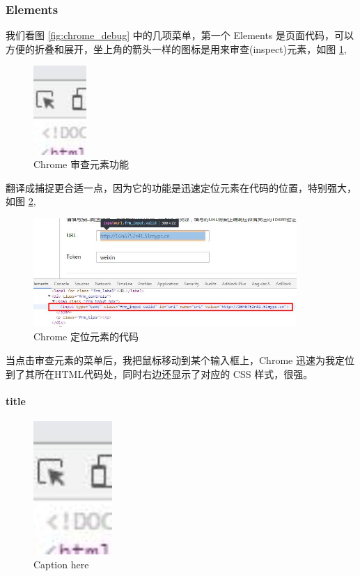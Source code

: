 \documentclass[UTF8]{ctexbook}
\begin{document}
{{            \subsubsection{Elements}
              \label{subsubsec:elements}
                我们看图 \ref{fig:chrome_debug} 中的几项菜单，第一个 Elements 是页面代码，可以方便的折叠和展开，坐上角的箭头一样的图标是用来审查(inspect)元素，如图 \ref{fig:cr_inspect},
                \begin{figure}[H]
                  \centering

                  \includegraphics[width=2cm]{./img/cr_inspect.jpg}
                  \caption{Chrome 审查元素功能}
                  \label{fig:cr_inspect}
                \end{figure}
                翻译成捕捉更合适一点，因为它的功能是迅速定位元素在代码的位置，特别强大，如图 \ref{fig:cr_inspect1},
                \begin{figure}[H]
                  \centering
                  \includegraphics[width=10cm]{./img/cr_inspect1.jpg}
                  \caption{Chrome 定位元素的代码}
                  \label{fig:cr_inspect1}
                \end{figure}
                当点击审查元素的菜单后，我把鼠标移动到某个输入框上，Chrome 迅速为我定位到了其所在HTML代码处，同时右边还显示了对应的 CSS 样式，很强。
                \paragraph{title}
                \begin{figure}[H]
                  \centering
                  \includegraphics[width=3cm]{./img/cr_inspect.jpg}
                  \caption{Caption here}
                  \label{fig:figure1}
                \end{figure}

}}
\end{document}
